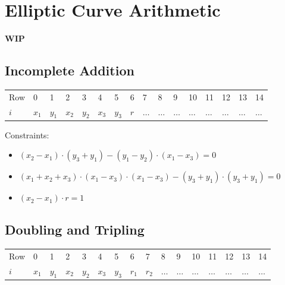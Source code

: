\section{Elliptic Curve Arithmetic}
\label{section:ec}
\textbf{WIP}

\subsection{Incomplete Addition}

\begin{center}
    \begin{table}[H]
        \begin{tabular}{llllllllllllllll}
            Row   & 0     & 1     & 2     & 3     & 4     & 5     & 6   & 7       & 8       & 9       & 10      & 11      & 12      & 13      & 14      \\
            $i$ & $x_1$ & $y_1$ & $x_2$ & $y_2$ & $x_3$ & $y_3$ & $r$ & $\dots$ & $\dots$ & $\dots$ & $\dots$ & $\dots$ & $\dots$ & $\dots$ & $\dots$ \\
        \end{tabular}
    \end{table}
\end{center}

Constraints:
\begin{itemize}
    \item $(x_2 - x_1) \cdot (y_3 + y_1) - (y_1 - y_2) \cdot (x_1 - x_3) = 0$
    \item $(x_1 + x_2 + x_3) \cdot (x_1 - x_3) \cdot (x_1 - x_3) - (y_3 + y_1) \cdot (y_3 + y_1) = 0$
    \item $(x_2 - x_1) \cdot r = 1$
\end{itemize}

\subsection{Doubling and Tripling}

\begin{center}
    \begin{table}[H]
        \begin{tabular}{llllllllllllllll}
            Row   & 0     & 1     & 2     & 3     & 4     & 5     & 6     & 7     & 8       & 9       & 10      & 11      & 12      & 13      & 14      \\
            $i$ & $x_1$ & $y_1$ & $x_2$ & $y_2$ & $x_3$ & $y_3$ & $r_1$ & $r_2$ & $\dots$ & $\dots$ & $\dots$ & $\dots$ & $\dots$ & $\dots$ & $\dots$ \\
        \end{tabular}
    \end{table}
\end{center}

